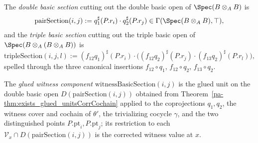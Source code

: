 \begin{definition}
  \label{pa-def:pairTripleSection}
  \leanok

  The \emph{double basic section} cutting out the double basic open of \(\Spec(B \otimes_A B)\)
  is
  \[
    \mathrm{pairSection}(i, j) := q_1^{\sharp}(P.r_i) \cdot q_2^{\sharp}(P.r_j)
    \in \Gamma(\Spec(B \otimes_A B), \top) ,
  \]
  and the \emph{triple basic section} cutting out the triple basic open of
  \(\Spec(B \otimes_A (B \otimes_A B))\) is
  \[
    \mathrm{tripleSection}(i, j, l) := (f_{12} q_1)^{\sharp}(P.r_i) \cdot
      \bigl( (f_{12} q_2)^{\sharp}(P.r_j) \cdot (f_{13} q_2)^{\sharp}(P.r_l) \bigr) ,
  \]
  spelled through the three canonical insertions \(f_{12} \circ q_1\), \(f_{12} \circ q_2\),
  \(f_{13} \circ q_2\).
\end{definition}

\begin{definition}
  \label{pa-def:witnessBasicSection}
  \leanok

  The \emph{glued witness component} \(\mathrm{witnessBasicSection}(i, j)\) is the glued unit on
  the double basic open \(D(\mathrm{pairSection}(i, j))\) obtained from
  Theorem~\ref{pa-thm:exists_glued_unitsCorrCochain} applied to the coprojections \(q_1, q_2\), the
  witness cover and cochain of \(\theta'\), the trivializing cocycle \(\gamma\), and the two
  distinguished points \(P.\mathrm{pt}_i, P.\mathrm{pt}_j\); its restriction to each
  \(\mathcal V_x \cap D(\mathrm{pairSection}(i, j))\) is the corrected witness value at \(x\).
\end{definition}

